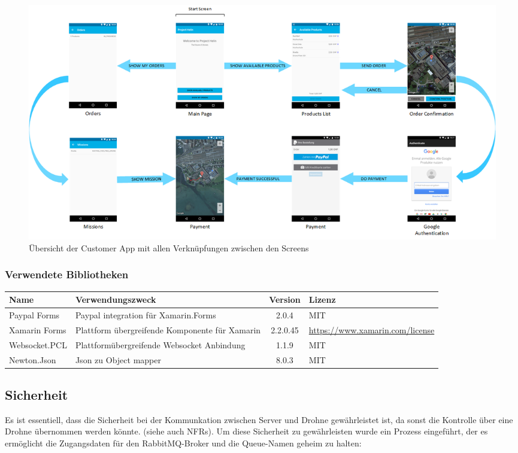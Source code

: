 \begin{landscape}
	\begin{figure}[h]
		\centering
		\includegraphics[width=0.8\paperheight] {images/customer-app-pages.png}
		\caption{Übersicht der Customer App mit allen Verknüpfungen zwischen den Screens}
		\label{fig:customer-app-flow}
	\end{figure}
\end{landscape}

\subsubsection{Verwendete Bibliotheken}
\begin{tabularx}{\textwidth}{|X|X|c|X|}
	\hline
	\textbf{Name} & \textbf{Verwendungszweck} & \textbf{Version} & \textbf{Lizenz} \\
	\hline \hline
	Paypal Forms & Paypal integration für Xamarin.Forms & 2.0.4 & MIT \\
	\hline 
	Xamarin Forms & Plattform übergreifende Komponente für Xamarin & 2.2.0.45 & \url{https://www.xamarin.com/license} \\
	\hline 
	Websocket.PCL & Plattformübergreifende Websocket Anbindung & 1.1.9 & MIT \\
	\hline 
	Newton.Json & Json zu Object mapper & 8.0.3 & MIT \\
	\hline 
\end{tabularx}

\subsection{Sicherheit}
Es ist essentiell, dass die Sicherheit bei der Kommunkation zwischen Server und Drohne gewährleistet ist, da sonst die Kontrolle über eine Drohne übernommen werden könnte. (siehe auch NFRs). Um diese Sicherheit zu gewährleisten wurde ein Prozess eingeführt, der es ermöglicht die Zugangsdaten für den RabbitMQ-Broker und die Queue-Namen geheim zu halten: \\

